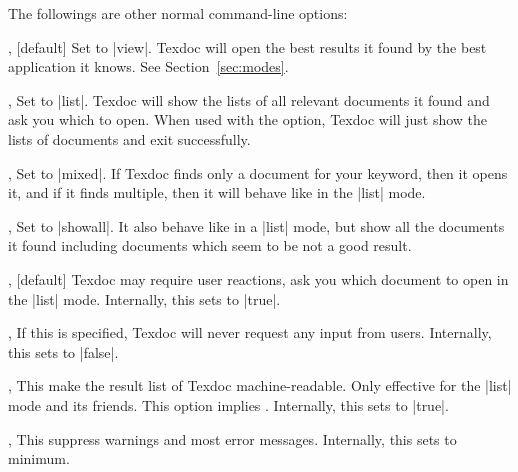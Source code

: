 \documentclass{texdoc-doc}
\begin{document}
The followings are other normal command-line options:

\begin{clopt}{, }[default]
Set  to |view|. Texdoc will open the best results it found by the best
application it knows. See Section~\ref{sec:modes}.
\end{clopt}

\begin{clopt}{, }
Set  to |list|. Texdoc will show the lists of all relevant documents
it found and ask you which to open. When used with the 
option, Texdoc will just show the lists of documents and exit successfully.
\end{clopt}

\begin{clopt}{, }
Set  to |mixed|. If Texdoc finds only a document for your keyword,
then it opens it, and if it finds multiple, then it will behave like in the
|list| mode.
\end{clopt}

\begin{clopt}{, }
Set  to |showall|. It also behave like in a |list| mode, but show all
the documents it found including documents which seem to be not a good result.
\end{clopt}

\begin{clopt}{, }[default]
Texdoc may require user reactions, \eg ask you which document to open in the
|list| mode. Internally, this sets  to |true|.
\end{clopt}

\begin{clopt}{, }
If this is specified, Texdoc will never request any input from users.
Internally, this sets  to |false|.
\end{clopt}

\begin{clopt}{, }
This make the result list of Texdoc machine-readable. Only effective for the
|list| mode and its friends. This option implies .
Internally, this sets  to |true|.
\end{clopt}

\begin{clopt}{, }
This suppress warnings and most error messages. Internally, this sets
 to minimum.
\end{clopt}
\end{document}
